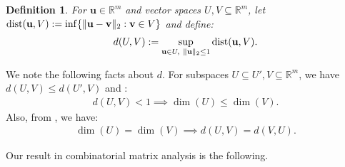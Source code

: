 \documentclass[9pt,twocolumn]{pnas-new}
\newtheorem{lemma}{Lemma}
\newtheorem{definition}{Definition}
\begin{document}
\begin{definition}\label{dDef}
For $\mathbf{u} \in \mathbb R^m$ and vector spaces $U,V \subseteq \mathbb{R}^m$, let $\text{\rm dist}(\mathbf{u}, V) := \inf \{\| \mathbf{u}-\mathbf{v} \|_2: \mathbf{v} \in V\}$ and define:
\begin{align}\label{d}
d(U,V) := \sup_{\mathbf{u} \in U, \ \|\mathbf{u}\|_2 \leq 1} \text{\rm dist}(\mathbf{u},V).
\end{align}
\end{definition}

We note the following facts about $d$. For subspaces $U \subseteq U', V \subseteq \mathbb{R}^m$, we have $d(U,V) \leq d(U',V)$ and \cite[Cor.~2.6]{Kato2013}:
\begin{align}\label{dimLem}
d(U,V) < 1 \implies \dim(U) \leq \dim(V).
\end{align}
Also, from \cite[Lem.~3.2]{Morris10}, we have:
\begin{align}\label{eqdim}
\dim(U) = \dim(V) \implies d(U,V) = d(V,U).
\end{align}



Our result in combinatorial matrix analysis is the following.

\end{document}

